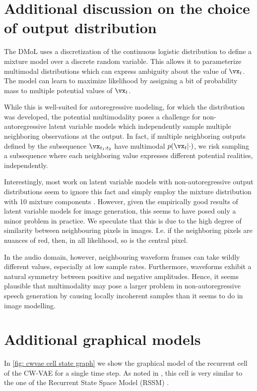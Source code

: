 {\section{Additional discussion on the choice of output distribution}\label{app: additional discussion on output distribution}
The DMoL uses a discretization of the continuous logistic distribution to define a mixture model over a discrete random variable. This allows it to parameterize multimodal distributions which can express ambiguity about the value of $\vx_t$.
The model can learn to maximize likelihood by assigning a bit of probability mass to multiple potential values of $\vx_t$.

While this is well-suited for autoregressive modeling, for which the distribution was developed, the potential multimodality poses a challenge for non-autoregressive latent variable models which independently sample multiple neighboring observations at the output.
In fact, if multiple neighboring outputs defined by the subsequence $\vx_{t_1:t_2}$ have multimodal $p(\vx_t|\cdot)$, we risk sampling a subsequence where each neighboring value expresses different potential realities, independently. 

Interestingly, most work on latent variable models with non-autoregressive output distributions seem to ignore this fact and simply employ the mixture distribution with 10 mixture components \cite{maaloe_biva_2019, vahdat_nvae_2020, child_very_2021}.
However, given the empirically good results of latent variable models for image generation, this seems to have posed only a minor problem in practice. We speculate that this is due to the high degree of similarity between neighbouring pixels in images. I.e. if the neighboring pixels are nuances of red, then, in all likelihood, so is the central pixel.

In the audio domain, however, neighbouring waveform frames can take wildly different values, especially at low sample rates. Furthermore, waveforms exhibit a natural symmetry between positive and negative amplitudes.
Hence, it seems plausible that multimodality may pose a larger problem in non-autoregressive speech generation by causing locally incoherent samples than it seems to do in image modelling.


\section{Additional graphical models}\label{app: additional graphical models}
In \cref{fig: cwvae cell state graph} we show the graphical model of the recurrent cell of the CW-VAE for a single time step. As noted in \cite{saxena_clockwork_2021}, this cell is very similar to the one of the Recurrent State Space Model (RSSM) \cite{hafner_learning_2019}.

}
